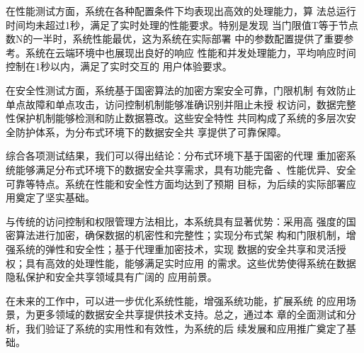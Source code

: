 在性能测试方面，系统在各种配置条件下均表现出高效的处理能力，算
法总运行时间均未超过1秒，满足了实时处理的性能要求。特别是发现
当门限值T等于节点数N的一半时，系统性能最优，这为系统在实际部署
中的参数配置提供了重要参考。系统在云端环境中也展现出良好的响应
性能和并发处理能力，平均响应时间控制在1秒以内，满足了实时交互的
用户体验要求。

在安全性测试方面，系统基于国密算法的加密方案安全可靠，门限机制
有效防止单点故障和单点攻击，访问控制机制能够准确识别并阻止未授
权访问，数据完整性保护机制能够检测和防止数据篡改。这些安全特性
共同构成了系统的多层次安全防护体系，为分布式环境下的数据安全共
享提供了可靠保障。

综合各项测试结果，我们可以得出结论：分布式环境下基于国密的代理
重加密系统能够满足分布式环境下的数据安全共享需求，具有功能完备
、性能优异、安全可靠等特点。系统在性能和安全性方面均达到了预期
目标，为后续的实际部署应用奠定了坚实基础。

与传统的访问控制和权限管理方法相比，本系统具有显著优势：采用高
强度的国密算法进行加密，确保数据的机密性和完整性；实现分布式架
构和门限机制，增强系统的弹性和安全性；基于代理重加密技术，实现
数据的安全共享和灵活授权；具有高效的处理性能，能够满足实时应用
的需求。这些优势使得系统在数据隐私保护和安全共享领域具有广阔的
应用前景。

在未来的工作中，可以进一步优化系统性能，增强系统功能，扩展系统
的应用场景，为更多领域的数据安全共享提供技术支持。总之，通过本
章的全面测试和分析，我们验证了系统的实用性和有效性，为系统的后
续发展和应用推广奠定了基础。
